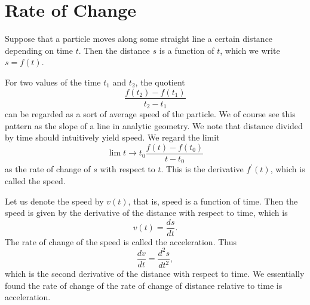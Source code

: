 \section*{Rate of Change}

Suppose that a particle moves along some straight line a certain distance depending on time $t$.
Then the distance $s$ is a function of $t$, which we write $s = f(t)$.

For two values of the time $t_1$ and $t_2$, the quotient
\[\frac{f(t_2) - f(t_1)}{t_2 - t_1}\]
can be regarded as a sort of average speed of the particle. We of course see this pattern as the slope of a line
in analytic geometry. We note that distance divided by time should intuitively yield speed. We regard the limit
\[\lim{t\to t_0} \frac{f(t) - f(t_0)}{t - t_0}\]
as the rate of change of $s$ with respect to $t$. This is the derivative $f^\prime(t)$, which is called the speed.

Let us denote the speed by $v(t)$, that is, speed is a function of time. Then the speed is given by the derivative
of the distance with respect to time, which is
\[v(t) = \frac{ds}{dt}.\]
The rate of change of the speed is called the acceleration. Thus
\[\frac{dv}{dt} = \frac{d^2s}{dt^2},\]
which is the second derivative of the distance with respect to time. We essentially found the rate of change of the
rate of change of distance relative to time is acceleration.
